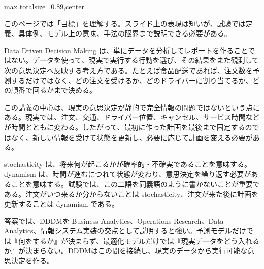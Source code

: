 \begin{minipage}[t]{0.58\textwidth}
\begin{adjustbox}{max totalsize={\textwidth}{0.89\textheight},center}
\begin{minipage}{\textwidth}\scriptsize
{}このページでは「目標」を理解する。スライド上の表現は短いが、試験では定義、具体例、モデル上の意味、手法の限界まで説明できる必要がある。\par
Data Driven Decision Making は、単にデータを分析してレポートを作ることではない。データを使って、現実で実行する行動を選び、その結果をまた観測して次の意思決定へ反映する考え方である。たとえば食品配送であれば、注文数を予測するだけではなく、どの注文を受けるか、どのドライバーに割り当てるか、どの順番で回るかまで決める。\par
この講義の中心は、現実の意思決定が静的で完全情報の問題ではないという点にある。現実では、注文、交通、ドライバー位置、キャンセル、サービス時間などが時間とともに変わる。したがって、最初に作った計画を最後まで固定するのではなく、新しい情報を受けて状態を更新し、必要に応じて計画を変える必要がある。\par
stochasticity は、将来何が起こるかが確率的・不確実であることを意味する。dynamism は、時間が進むにつれて状態が変わり、意思決定を繰り返す必要があることを意味する。試験では、この二語を同義語のように書かないことが重要である。注文がいつ来るか分からないことは stochasticity、注文が来た後に計画を更新することは dynamism である。\par
答案では、DDDMを Business Analytics、Operations Research、Data Analytics、情報システム実装の交点として説明すると強い。予測モデルだけでは『何をするか』が決まらず、最適化モデルだけでは『現実データをどう入れるか』が決まらない。DDDMはこの間を接続し、現実のデータから実行可能な意思決定を作る。\par

\end{minipage}
\end{adjustbox}
\end{minipage}
